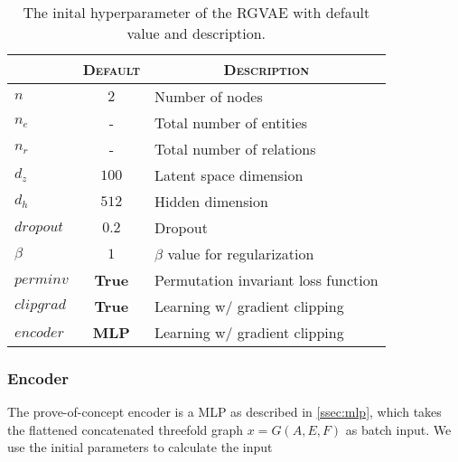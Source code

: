 \begin{table}[H]
\centering
    \begin{tabular}{|l|l|l|}
    \hline
    \rowcolor[HTML]{EFEFEF}
    \multicolumn{1}{|c}{\textsc{Hyerp.}} & \multicolumn{1}{c}{\textsc{Default}} & \multicolumn{1}{c|}{\textsc{Description}} \\\hline
    $n$     & \multicolumn{1}{c|}{$2$} & Number of nodes  \\
    $n_e$   &\multicolumn{1}{c|}{-}   & Total number of entities\\
    $n_r$   &\multicolumn{1}{c|}{-} & Total number of relations\\
    $d_z$ &\multicolumn{1}{c|}{$100$}   & Latent space dimension\\
    $d_h$ &\multicolumn{1}{c|}{$512$}   & Hidden dimension\\
    $dropout$ &\multicolumn{1}{c|}{$0.2$}   & Dropout\\
    $\beta$ & \multicolumn{1}{c|}{$1$}  & $\beta$ value for regularization  \\
    $perminv$ & \multicolumn{1}{c|}{\textbf{True}}  & Permutation invariant loss function  \\
    $clipgrad$ & \multicolumn{1}{c|}{\textbf{True}}  & Learning w/ gradient clipping  \\
    $encoder$ & \multicolumn{1}{c|}{\textbf{MLP}}  & Learning w/ gradient clipping  \\
    \hline
    \end{tabular}
    \caption{The inital hyperparameter of the RGVAE with default value and description.}
    \label{tab:RGVAE}
\end{table}


\subsubsection{Encoder}

The prove-of-concept encoder is a MLP as described in \ref{ssec:mlp}, which takes the flattened concatenated threefold graph $x=G(A,E,F)$ as batch input. We use the initial parameters to calculate the input

